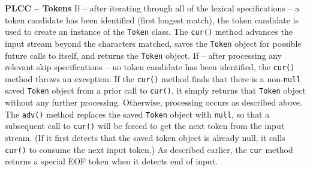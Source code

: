 \begin{minipage}[t]{\sw}
\slidenumber
\LARGE
{\bf PLCC -- Tokens}\exx
If -- after iterating through all of the lexical specifications --
a token candidate has been identified (first longest match),
the token candidate is used 
to create an instance of the \verb'Token' class.
The \verb'cur()' method advances the input stream
beyond the characters matched,
saves the \verb'Token' object for possible future calls to itself,
and returns the \verb'Token' object.
If -- after processing any relevant skip specifications --
no token candidate has been identified,
the \verb'cur()' method throws an exception.\exx
If the \verb'cur()' method finds that there is
a non-\verb'null' saved \verb'Token' object from a prior call to \verb'cur()',
it simply returns that \verb'Token' object without any further processing.
Otherwise, processing occurs as described above.\exx
The \verb'adv()' method replaces
the saved \verb'Token' object with \verb'null',
so that a subsequent call to \verb'cur()' will be forced
to get the next token from the input stream.
(If it first detects that the saved token object is already null,
it calls \verb'cur()' to consume the next input token.)\exx
As described earlier, the \verb'cur' method returns a special
EOF token when it detects end of input.
\end{minipage}
\clearpage

